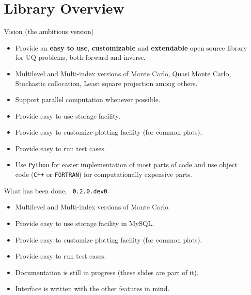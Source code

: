 {
\nofooter \noheader \frame[noframenumbering]{\titlepage}
}
{
}

\section{Library Overview}
\begin{frame}{Vision (the ambitious version)}
  \begin{itemize}
  \item Provide an \textbf{easy to use}, \textbf{customizable} and
    \textbf{extendable} open source library for UQ problems, both
    forward and inverse.
  \item Multilevel and Multi-index versions of Monte Carlo, Quasi Monte
    Carlo, Stochastic collocation, Least square projection among
    others.
  \item Support parallel computation whenever possible.
  \item Provide easy to use storage facility.
  \item Provide easy to customize plotting facility (for common
    plots).
  \item Provide easy to run test cases.
  \item Use \texttt{Python} for easier implementation of most parts of code
    and use object code (\texttt{C++} or \texttt{FORTRAN}) for
    computationally expensive parts.
  \end{itemize}
\end{frame}

\begin{frame}{What has been done, \lib~\texttt{0.2.0.dev0}}
  \begin{itemize}
  \item Multilevel and Multi-index versions of Monte Carlo.
  \item Provide easy to use storage facility in MySQL.
  \item Provide easy to customize plotting facility (for common
    plots).
  \item Provide easy to run test cases.
  \item Documentation is still in progress (these slides are part of it).
  \item Interface is written with the other features in mind.
  \end{itemize}
\end{frame}

